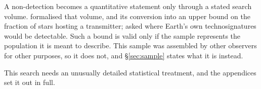 A non-detection becomes a quantitative statement only through a stated
search volume. \citet{Wright2018} formalised that volume, and
\citet{Margot2023} its conversion into an upper bound on the fraction of
stars hosting a transmitter; \citet{EarthDetectingEarth2025} asked where
Earth's own technosignatures would be detectable. Such a bound is valid
only if the sample represents the population it is meant to describe.
This sample was assembled by other observers for other purposes, so it
does not, and \S\ref{sec:sample} states what it is instead.

This search needs an unusually detailed statistical treatment, and the
appendices set it out in full.

